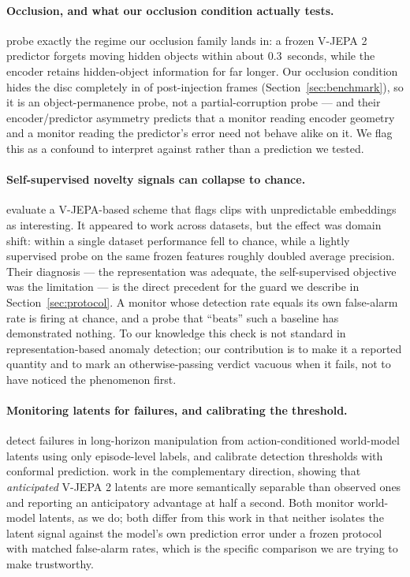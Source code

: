 \paragraph{Occlusion, and what our occlusion condition actually tests.}
\citet{xie2026tracking} probe exactly the regime our occlusion family lands in:
a frozen V-JEPA 2 predictor forgets moving hidden objects within about
$0.3$~seconds, while the encoder retains hidden-object information for far
longer. Our occlusion condition hides the disc completely in \lgwOccFullyHidden{}
of post-injection frames (Section~\ref{sec:benchmark}), so it is an object-permanence
probe, not a partial-corruption probe --- and their encoder/predictor asymmetry
predicts that a monitor reading encoder geometry and a monitor reading the
predictor's error need not behave alike on it. We flag this as a confound to
interpret against rather than a prediction we tested.

\paragraph{Self-supervised novelty signals can collapse to chance.}
\citet{pavuluri2026asleep} evaluate a V-JEPA-based scheme that flags clips with
unpredictable embeddings as interesting. It appeared to work across datasets,
but the effect was domain shift: within a single dataset performance fell to
chance, while a lightly supervised probe on the same frozen features roughly
doubled average precision. Their diagnosis --- the representation was adequate,
the self-supervised objective was the limitation --- is the direct precedent for
the guard we describe in Section~\ref{sec:protocol}. A monitor whose detection
rate equals its own false-alarm rate is firing at chance, and a probe that
``beats'' such a baseline has demonstrated nothing. To our knowledge this check
is not standard in representation-based anomaly detection; our contribution is
to make it a reported quantity and to mark an otherwise-passing verdict vacuous
when it fails, not to have noticed the phenomenon first.

\paragraph{Monitoring latents for failures, and calibrating the threshold.}
\citet{zhang2026foresight} detect failures in long-horizon manipulation from
action-conditioned world-model latents using only episode-level labels, and
calibrate detection thresholds with conformal prediction. \citet{samad2026puls}
work in the complementary direction, showing that \emph{anticipated} V-JEPA 2
latents are more semantically separable than observed ones and reporting an
anticipatory advantage at half a second. Both monitor world-model latents, as we
do; both differ from this work in that neither isolates the latent signal
against the model's own prediction error under a frozen protocol with matched
false-alarm rates, which is the specific comparison we are trying to make
trustworthy.

